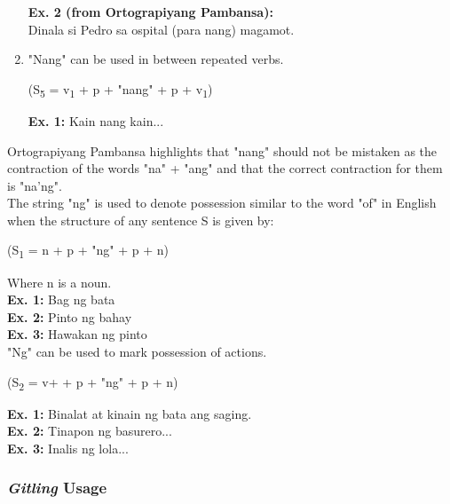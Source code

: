 \begin{enumerate}
            \textbf{Ex. 2 (from Ortograpiyang Pambansa):} \\
            Dinala si Pedro sa ospital (para {\textpipe} nang) magamot.

      \item "Nang" can be used in between repeated verbs.

            \begin{center}
                  (S\textsubscript{5} = v\textsubscript{1} + p + "nang" + p + v\textsubscript{1})
            \end{center}

            \textbf{Ex. 1:} Kain nang kain...

\end{enumerate}

Ortograpiyang Pambansa highlights that "nang" should not be mistaken as 
the contraction of the words "na" + "ang" and that the correct contraction 
for them is "na'ng". \\

The string "ng" is used to denote possession similar to the word "of" in English 
when the structure of any sentence S is given by:

      \begin{center}
            (S\textsubscript{1} = n + p + "ng" + p + n)
      \end{center}

Where n is a noun. \\

\noindent\textbf{Ex. 1:} Bag ng bata \\
\textbf{Ex. 2:} Pinto ng bahay \\
\textbf{Ex. 3:} Hawakan ng pinto \\

"Ng" can be used to mark possession of actions.


      \begin{center}
            (S\textsubscript{2} = v+ + p + "ng" + p + n)
      \end{center}

\noindent\textbf{Ex. 1:} Binalat at kinain ng bata ang saging. \\
\textbf{Ex. 2:} Tinapon ng basurero... \\
\textbf{Ex. 3:} Inalis ng lola... \\


\subsubsection{\textit{Gitling} Usage}\texttt{}